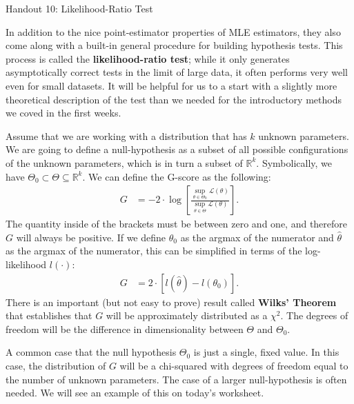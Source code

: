 \documentclass{tufte-handout}
\begin{document}
\justify

{\LARGE Handout 10: Likelihood-Ratio Test}

\vspace*{18pt}

\noindent
In addition to the nice point-estimator properties of MLE estimators,
they also come along with a built-in general procedure for building 
hypothesis tests. This process is called the \textbf{likelihood-ratio test};
while it only generates asymptotically correct tests in the limit of large
data, it often performs very well even for small datasets. It will be
helpful for us to a start with a slightly more theoretical description
of the test than we needed for the introductory methods we coved in the
first weeks.

Assume that we are working with a distribution that has $k$ unknown
parameters. We are going to define a null-hypothesis as a subset of
all possible configurations of the unknown parameters, which is in
turn a subset of $\mathbb{R}^k$. Symbolically, we have 
$\Theta_0 \subset \Theta \subseteq \mathbb{R}^k$. We can define the
G-score as the following:
\begin{align*}
G &= -2 \cdot \log \left[ \frac{
  \sup_{\theta \in \Theta_0} \mathcal{L}(\theta)
}{
  \sup_{\theta \in \Theta} \mathcal{L}(\theta)
} \right].
\end{align*}
The quantity inside of the brackets must be between zero and one, and
therefore $G$ will always be positive. If we define $\theta_0$ as the
argmax of the numerator and $\hat{\theta}$ as the argmax of the numerator,
this can be simplified in terms of the log-likelihood $l(\cdot)$:
\begin{align*}
G &= 2 \cdot \left[ l(\hat{\theta}) - l(\theta_0) \right].
\end{align*}
There is an important (but not easy to prove) result called
\textbf{Wilks' Theorem} that establishes that $G$ will be 
approximately distributed as a $\chi^2$. The degrees of freedom
will be the difference in dimensionality between $\Theta$ and
$\Theta_0$. 

A common case that the null hypothesis $\Theta_0$ is just a
single, fixed value. In this case, the distribution of $G$ will
be a chi-squared with degrees of freedom equal to the number of
unknown parameters. The case of a larger null-hypothesis is
often needed. We will see an example of this on today's worksheet.
\end{document}
